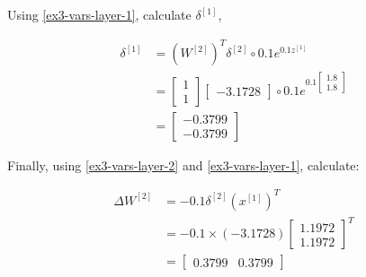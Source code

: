 \documentclass[12pt]{article}
\begin{document}
\begin{enumerate}[leftmargin=\labelsep]
\begin{paracol}{3}
              Using \eqref{ex3-vars-layer-1}, calculate $\delta^{[1]}$,
              \begin{footnotesize}
                  $$
                      \begin{aligned}
                          \delta^{[1]} & = \left(W^{[2]}\right)^T \delta^{[2]} \circ 0.1 e^{0.1 z^{[1]}} \\
                                       & = \begin{bmatrix}
                                               1 \\ 1
                                           \end{bmatrix}
                          \begin{bmatrix}
                              -3.1728
                          \end{bmatrix}
                          \circ
                          0.1 e^{0.1 \begin{bmatrix}
                                                 1.8 \\
                                                 1.8
                                             \end{bmatrix}}                                                      \\
                                       & = \begin{bmatrix}
                                               -0.3799 \\
                                               -0.3799
                                           \end{bmatrix}
                      \end{aligned}
                  $$
              \end{footnotesize}

              Finally, using \eqref{ex3-vars-layer-2} and \eqref{ex3-vars-layer-1},
              calculate:

              \begin{footnotesize}
                  $$
                      \begin{aligned}
                          \Delta W^{[2]} & = -0.1 \delta^{[2]} \left(x^{[1]}\right)^T \\
                                         & = -0.1 \times (-3.1728) \begin{bmatrix}
                                                                       1.1972 \\
                                                                       1.1972
                                                                   \end{bmatrix}^T    \\
                                         & = \begin{bmatrix}
                                                 0.3799 & 0.3799
                                             \end{bmatrix}
                      \end{aligned}
                  $$


\end{footnotesize}
\end{paracol}
\end{enumerate}
\end{document}
